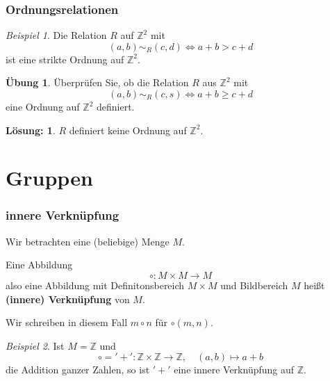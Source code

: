 \documentclass[hyperref={pdfpagelabels=false}]{beamer}
\theoremstyle{plain}%
\theoremstyle{definition}
\newtheorem*{uebung}{Übung}
\newtheorem*{sol}{Lösung:}
\theoremstyle{remark}
\newtheorem*{beispiel}{Beispiel}
\def \Z{\mathbb Z}
\begin{document}
\begin{frame}
\frametitle{Ordnungsrelationen}

\begin{beispiel}
Die Relation $R$ auf $\Z^2$ mit 
	$$ (a,b) \sim_R (c,d) \iff a+b > c+d $$
ist eine strikte Ordnung auf $\Z^2$.
\end{beispiel}

\pause 

\begin{uebung} 
Überprüfen Sie, ob die Relation $R$ aus $\Z^2$ mit 
	$$ (a,b) \sim_R (c,s) \iff a+b \geq c+d $$
eine Ordnung auf $\Z^2$  definiert.
\end{uebung}

\pause \pause 

\begin{sol} $R$ definiert keine Ordnung auf $\Z^2$. 

%
\end{sol}

\end{frame}

\section{Gruppen}

\begin{frame}
\frametitle{innere Verknüpfung}

Wir betrachten eine (beliebige) Menge $M$. 

\pause

\begin{definition} Eine Abbildung 
  	$$ \circ : M \times M \longrightarrow M $$
also eine Abbildung mit Definitonsbereich $M \times M$ und Bildbereich $M$ heißt 
\textbf{(innere) Verknüpfung} von $M$. 

Wir schreiben in diesem Fall $m \circ n$ für $\circ(m,n)$.
\end{definition}

\pause 

\begin{beispiel} Ist $M = \mathbb Z$ und 
  	$$ \circ = '+': \mathbb Z \times \mathbb Z \longrightarrow \mathbb Z, \quad (a,b) \longmapsto a + b $$
die Addition ganzer Zahlen, so ist $'+'$ eine innere Verknüpfung auf $\mathbb Z$.
\end{beispiel}
\end{frame}
\end{document}
